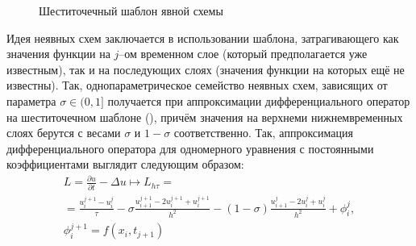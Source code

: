 \begin{figure}
    \centering
    \caption{Шеститочечный шаблон явной схемы}
    \label{fig:implicit_template}
\end{figure}
Идея неявных схем заключается в использовании шаблона, затрагивающего как значения функции на $j$--ом временном слое (который предполагается уже известным), так и на последующих слоях (значения функции на которых ещё не известны).
Так, однопараметрическое семейство неявных схем, зависящих от параметра $\sigma \in (0, 1]$ получается при аппроксимации дифференциального оператор на шеститочечном шаблоне (), причём значения на \glqq верхнем\grqq и \glqq нижнем\grqq временных слоях берутся с весами $\sigma$ и $1 - \sigma$ соответственно.
Так, аппроксимация дифференциального оператора для одномерного уравнения с постоянными коэффициентами выглядит следующим образом:
\begin{multline*}
    L = \frac{\partial u}{\partial t} - \Delta u \mapsto 
    L_{h\tau} =\\
    = \frac{u_i^{j + 1} - u_i^j}{\tau} -
    \sigma\frac{u_{i + 1}^{j + 1} - 2u_i^{j + 1} + u_i^{j + 1}}{h^2}  -
    (1 - \sigma)\frac{u_{i + 1}^j - 2u_i^j + u_i^j}{h^2} + \phi_i^j,\\
    \phi_i^{j + 1} = f(x_i, t_{j + 1})
\end{multline*}
